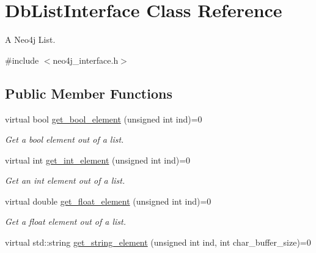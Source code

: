 \hypertarget{classDbListInterface}{}\section{Db\+List\+Interface Class Reference}
\label{classDbListInterface}


A Neo4j List.  




{\ttfamily \#include $<$neo4j\+\_\+interface.\+h$>$}

\subsection*{Public Member Functions}
\begin{DoxyCompactItemize}
\item 
virtual bool \hyperlink{classDbListInterface_aed51c97a5b72e67402d750bf8540b7b4}{get\+\_\+bool\+\_\+element} (unsigned int ind)=0\hypertarget{classDbListInterface_aed51c97a5b72e67402d750bf8540b7b4}{}\label{classDbListInterface_aed51c97a5b72e67402d750bf8540b7b4}

\begin{DoxyCompactList}\small\item\em Get a bool element out of a list. \end{DoxyCompactList}\item 
virtual int \hyperlink{classDbListInterface_a21aa8acc708256af0e5b81f264961ab5}{get\+\_\+int\+\_\+element} (unsigned int ind)=0\hypertarget{classDbListInterface_a21aa8acc708256af0e5b81f264961ab5}{}\label{classDbListInterface_a21aa8acc708256af0e5b81f264961ab5}

\begin{DoxyCompactList}\small\item\em Get an int element out of a list. \end{DoxyCompactList}\item 
virtual double \hyperlink{classDbListInterface_aa9b41e8118f2e1689a84fe7611eef8a2}{get\+\_\+float\+\_\+element} (unsigned int ind)=0\hypertarget{classDbListInterface_aa9b41e8118f2e1689a84fe7611eef8a2}{}\label{classDbListInterface_aa9b41e8118f2e1689a84fe7611eef8a2}

\begin{DoxyCompactList}\small\item\em Get a float element out of a list. \end{DoxyCompactList}\item 
virtual std\+::string \hyperlink{classDbListInterface_ac30844705b9358941448b5ee3db91542}{get\+\_\+string\+\_\+element} (unsigned int ind, int char\+\_\+buffer\+\_\+size)=0\hypertarget{classDbListInterface_ac30844705b9358941448b5ee3db91542}{}\label{classDbListInterface_ac30844705b9358941448b5ee3db91542}


\end{DoxyCompactItemize}
